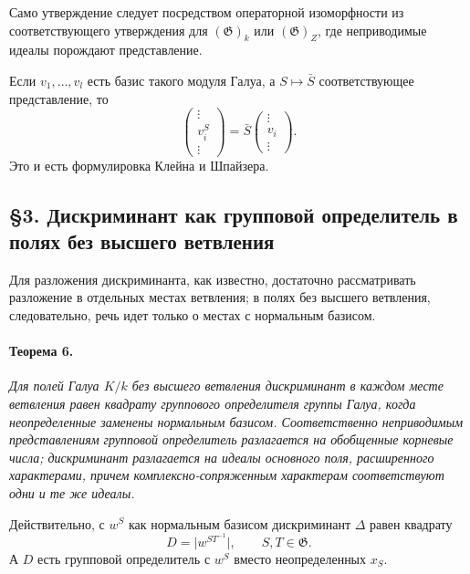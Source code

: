 \documentclass[11pt]{article}
\providecommand{\Gg}{\mathfrak{G}}
\begin{document}
Само утверждение следует посредством операторной изоморфности из соответствующего утверждения для \((\Gg)_k\) или \((\Gg)_Z\), где неприводимые идеалы порождают представление.

Если \(v_1,\ldots,v_l\) есть базис такого модуля Галуа, а \(S\mapsto \bar S\) соответствующее представление, то
\[
        \begin{pmatrix}\vdots\\ v_i^S\\ \vdots\end{pmatrix}
        =\bar S\begin{pmatrix}\vdots\\ v_i\\ \vdots\end{pmatrix}.
\]
Это и есть формулировка Клейна и Шпайзера.

\subsection*{§3. Дискриминант как групповой определитель в полях без высшего ветвления}

Для разложения дискриминанта, как известно, достаточно рассматривать разложение в отдельных местах ветвления; в полях без высшего ветвления, следовательно, речь идет только о местах с нормальным базисом.

\paragraph{Теорема 6.}
\emph{Для полей Галуа \(K/k\) без высшего ветвления дискриминант в каждом месте ветвления равен квадрату группового определителя группы Галуа, когда неопределенные заменены нормальным базисом. Соответственно неприводимым представлениям групповой определитель разлагается на обобщенные корневые числа; дискриминант разлагается на идеалы основного поля, расширенного характерами, причем комплексно-сопряженным характерам соответствуют одни и те же идеалы.}

Действительно, с \(w^S\) как нормальным базисом дискриминант \(\Delta\) равен квадрату
\[
        D=\bigl|w^{ST^{-1}}\bigr|,\qquad S,T\in\Gg.
\]
А \(D\) есть групповой определитель с \(w^S\) вместо неопределенных \(x_S\).
\end{document}
